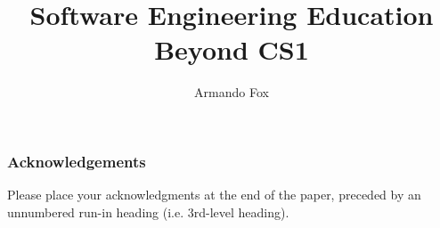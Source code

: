 \documentclass[runningheads]{llncs}
\begin{document}
%
\title{Software Engineering Education Beyond CS1}
%
%
\author{Armando Fox}

%
%
%
\maketitle              %
%
\begin{abstract}


\end{abstract}
%





%
%

\subsubsection{Acknowledgements} Please place your acknowledgments at
the end of the paper, preceded by an unnumbered run-in heading (i.e.
3rd-level heading).



\end{document}
